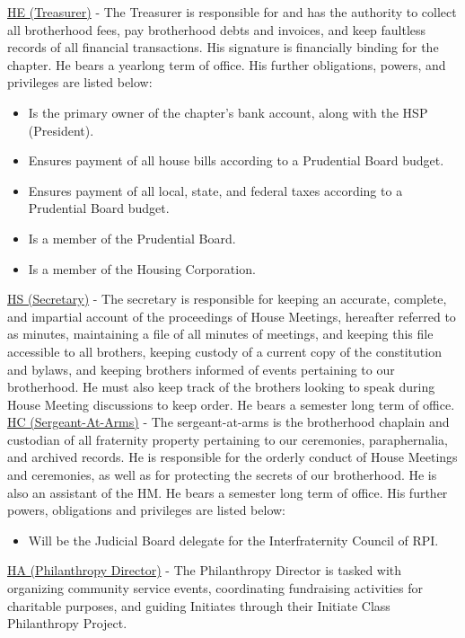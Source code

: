 \documentclass{article}
\begin{document}
\underline{HE (Treasurer)} - The Treasurer is responsible for and has the authority to collect all brotherhood fees, pay brotherhood debts and invoices, and keep faultless records of all financial transactions. His signature is financially binding for the chapter. He bears a yearlong term of office. His further obligations, powers, and privileges are listed below:
\begin{itemize}
    \item Is the primary owner of the chapter’s bank account, along with the HSP (President).
    \item Ensures payment of all house bills according to a Prudential Board budget.
    \item Ensures payment of all local, state, and federal taxes according to a Prudential Board budget.
    \item Is a member of the Prudential Board.
    \item Is a member of the Housing Corporation.
\end{itemize}

\underline{HS (Secretary)} - The secretary is responsible for keeping an accurate, complete, and impartial account of the proceedings of House Meetings, hereafter referred to as minutes, maintaining a file of all minutes of meetings, and keeping this file accessible to all brothers, keeping custody of a current copy of the constitution and bylaws, and keeping brothers informed of events pertaining to our brotherhood. He must also keep track of the brothers looking to speak during House Meeting discussions to keep order. He bears a semester long term of office.\\

\underline{HC (Sergeant-At-Arms)} - The sergeant-at-arms is the brotherhood chaplain and custodian of all fraternity property pertaining to our ceremonies, paraphernalia, and archived records. He is responsible for the orderly conduct of House Meetings and ceremonies, as well as for protecting the secrets of our brotherhood. He is also an assistant of the HM. He bears a semester long term of office. His further powers, obligations and privileges are listed below:
\begin{itemize}
    \item Will be the Judicial Board delegate for the Interfraternity Council of RPI.
\end{itemize}

\underline{HA (Philanthropy Director)} - The Philanthropy Director is tasked with organizing community service events, coordinating fundraising activities for charitable purposes, and guiding Initiates through their Initiate Class Philanthropy Project.\\
\end{document}
